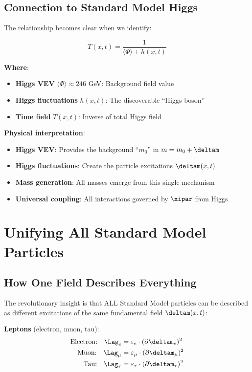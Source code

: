 	\subsection{Connection to Standard Model Higgs}
	
	The relationship becomes clear when we identify:
	
	\begin{equation}
		T(x,t) = \frac{1}{\langle\Phi\rangle + h(x,t)}
	\end{equation}
	
	\textbf{Where}:
	\begin{itemize}
		\item \textbf{Higgs VEV} $\langle\Phi\rangle \approx 246$ GeV: Background field value
		\item \textbf{Higgs fluctuations} $h(x,t)$: The discoverable ``Higgs boson''
		\item \textbf{Time field} $T(x,t)$: Inverse of total Higgs field
	\end{itemize}
	
	\textbf{Physical interpretation}:
	\begin{itemize}
		\item \textbf{Higgs VEV}: Provides the background ``$m_0$'' in $m = m_0 + \deltam$
		\item \textbf{Higgs fluctuations}: Create the particle excitations $\deltam(x,t)$
		\item \textbf{Mass generation}: All masses emerge from this single mechanism
		\item \textbf{Universal coupling}: All interactions governed by $\xipar$ from Higgs
	\end{itemize}
	
	\section{Unifying All Standard Model Particles}
	
	\subsection{How One Field Describes Everything}
	
	The revolutionary insight is that ALL Standard Model particles can be described as different excitations of the same fundamental field $\deltam(x,t)$:
	
	\textbf{Leptons} (electron, muon, tau):
	\begin{align}
		\text{Electron:} \quad \Lag_e &= \varepsilon_e \cdot (\partial \deltam_e)^2 \\
		\text{Muon:} \quad \Lag_{\mu} &= \varepsilon_{\mu} \cdot (\partial \deltam_{\mu})^2 \\
		\text{Tau:} \quad \Lag_{\tau} &= \varepsilon_{\tau} \cdot (\partial \deltam_{\tau})^2
	\end{align}
	
